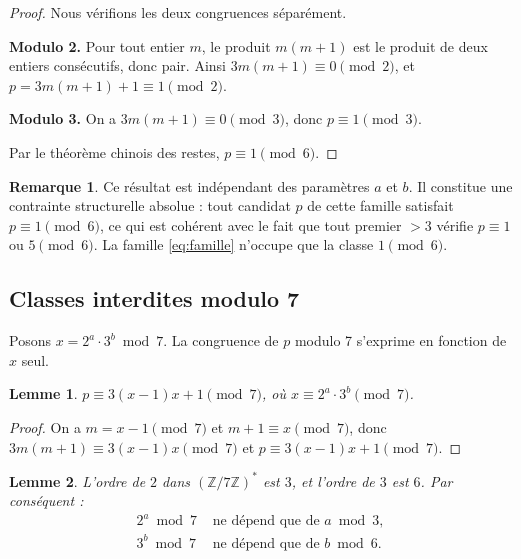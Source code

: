 \documentclass[12pt,a4paper]{article}
\newtheorem{lemme}{Lemme}
\theoremstyle{definition}
\newtheorem{remarque}{Remarque}
\newcommand{\Z}{\mathbb{Z}}
\begin{document}
\begin{proof}
  Nous vérifions les deux congruences séparément.

  \medskip
  \textbf{Modulo 2.}
  Pour tout entier $m$, le produit $m(m+1)$ est le produit de deux
  entiers consécutifs, donc pair. Ainsi $3m(m+1) \equiv 0 \pmod{2}$,
  et $p = 3m(m+1)+1 \equiv 1 \pmod{2}$.

  \medskip
  \textbf{Modulo 3.}
  On a $3m(m+1) \equiv 0 \pmod{3}$, donc $p \equiv 1 \pmod{3}$.

  \medskip
  Par le théorème chinois des restes, $p \equiv 1 \pmod{6}$.
\end{proof}

\begin{remarque}
  Ce résultat est indépendant des paramètres $a$ et $b$.
  Il constitue une contrainte structurelle absolue :
  tout candidat $p$ de cette famille satisfait $p \equiv 1 \pmod{6}$,
  ce qui est cohérent avec le fait que tout premier $> 3$
  vérifie $p \equiv 1$ ou $5 \pmod{6}$.
  La famille \eqref{eq:famille} n'occupe que la classe $1 \pmod{6}$.
\end{remarque}

\subsection{Classes interdites modulo 7}

Posons $x = 2^a \cdot 3^b \bmod 7$.
La congruence de $p$ modulo 7 s'exprime en fonction de $x$ seul.

\begin{lemme}\label{lem:pmod7}
  $p \equiv 3(x-1)x + 1 \pmod{7}$, où $x \equiv 2^a \cdot 3^b \pmod{7}$.
\end{lemme}

\begin{proof}
  On a $m = x - 1 \pmod{7}$ et $m+1 \equiv x \pmod{7}$, donc
  $3m(m+1) \equiv 3(x-1)x \pmod{7}$ et $p \equiv 3(x-1)x + 1 \pmod{7}$.
\end{proof}

\begin{lemme}\label{lem:xmod7}
  L'ordre de $2$ dans $(\Z/7\Z)^*$ est $3$, et l'ordre de $3$ est $6$.
  Par conséquent :
  \begin{align*}
    2^a \bmod 7 &\text{ ne dépend que de } a \bmod 3,\\
    3^b \bmod 7 &\text{ ne dépend que de } b \bmod 6.
  \end{align*}
\end{lemme}
\end{document}
